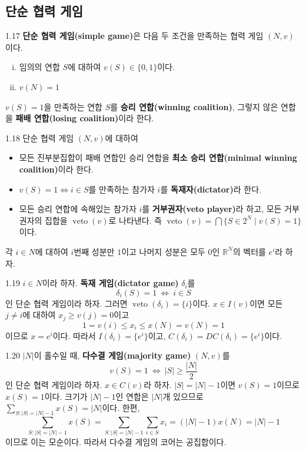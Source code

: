 \documentclass{article}
\numberwithin{equation}{section}
\begin{document}
\subsection{단순 협력 게임}
\begin{dfn}{}{1.17}
	\textbf{단순 협력 게임(simple game)}은 다음 두 조건을 만족하는 협력 게임 $(N,v)$이다.
	\begin{enumerate}[(i)]
		\item 임의의 연합 $S$에 대하여 $v(S)\in\{0,1\}$이다.
		\item $v(N)=1$
	\end{enumerate}
	$v(S)=1$을 만족하는 연합 $S$를 \textbf{승리 연합(winning coalition)}, 그렇지 않은 연합을 \textbf{패배 연합(losing coalition)}이라 한다.
\end{dfn}

\begin{dfn}{}{1.18}
	단순 협력 게임 $(N,v)$에 대하여
	\begin{itemize}
		\item 모든 진부분집합이 패배 연합인 승리 연합을 \textbf{최소 승리 연합(minimal winning coalition)}이라 한다.
		\item $v(S)=1\Longleftrightarrow i\in S$를 만족하는 참가자 $i$를 \textbf{독재자(dictator)}라 한다.
		\item 모든 승리 연합에 속해있는 참가자 $i$를 \textbf{거부권자(veto player)}라 하고, 모든 거부권자의 집합을 $\operatorname{veto}(v)$로 나타낸다. 즉 $\operatorname{veto}(v)=\bigcap\{S\in 2^N\mid v(S)=1\}$이다.
	\end{itemize}
\end{dfn}

각 $i\in N$에 대하여 $i$번째 성분만 $1$이고 나머지 성분은 모두 $0$인 $\mathbb R^N$의 벡터를 $e^i$라 하자.

\begin{example}{}{1.19}
	$i\in N$이라 하자. \textbf{독재 게임(dictator game)} $\delta_i$를
	\[
		\delta_i(S)=1~\Longleftrightarrow~i\in S
	\]
	인 단순 협력 게임이라 하자. 그러면 $\operatorname{veto}(\delta_i)=\{i\}$이다. $x\in I(v)$이면 모든 $j\ne i$에 대하여 $x_j\geq v(j)=0$이고
	\[
		1=v(i)\leq x_i\leq x(N)=v(N)=1
	\]
	이므로 $x=e^i$이다. 따라서 $I(\delta_i)=\{e^i\}$이고, $C(\delta_i)=DC(\delta_i)=\{e^i\}$이다.
\end{example}

\begin{example}{}{1.20}
	$\vert N\vert$이 홀수일 때, \textbf{다수결 게임(majority game)} $(N,v)$를
	\[
		v(S)=1~\Longleftrightarrow~\vert S\vert\geq\frac{\vert N\vert}{2}
	\]
	인 단순 협력 게임이라 하자. $x\in C(v)$라 하자. $\vert S\vert=\vert N\vert-1$이면 $v(S)=1$이므로 $x(S)=1$이다. 크기가 $\vert N\vert-1$인 연합은 $\vert N\vert$개 있으므로 $\sum_{S:\vert S\vert=\vert N\vert-1}x(S)=\vert N\vert$이다. 한편,
	\[
		\sum_{S:\vert S\vert=\vert N\vert-1}x(S)=\sum_{S:\vert S\vert=\vert N\vert-1}\sum_{i\in S}x_i=(\vert N\vert-1)x(N)=\vert N\vert-1
	\]
	이므로 이는 모순이다. 따라서 다수결 게임의 코어는 공집합이다.
\end{example}
\end{document}
